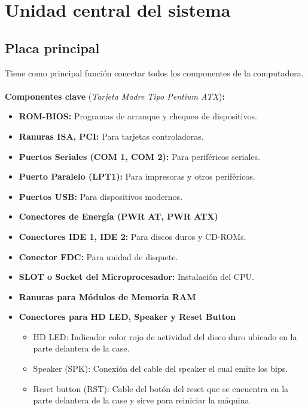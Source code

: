 \documentclass{templateNote}
\begin{document}
\section{Unidad central del sistema}

\subsection{Placa principal}
\noindent Tiene como principal función conectar todos los componentes de la computadora.\\\\
\textbf{Componentes clave} (\textit{Tarjeta Madre Tipo Pentium ATX})\textbf{:}
\begin{itemize}
    \item \textbf{ROM-BIOS:} Programas de arranque y chequeo de dispositivos.
    \item \textbf{Ranuras ISA, PCI:} Para tarjetas controladoras.
    \item \textbf{Puertos Seriales (COM 1, COM 2):} Para periféricos seriales.
    \item \textbf{Puerto Paralelo (LPT1):} Para impresoras y otros periféricos.
    \item \textbf{Puertos USB:} Para dispositivos modernos.
    \item \textbf{Conectores de Energía (PWR AT, PWR ATX)}
    \item \textbf{Conectores IDE 1, IDE 2:} Para discos duros y CD-ROMs.
    \item \textbf{Conector FDC:} Para unidad de disquete.
    \item \textbf{SLOT o Socket del Microprocesador:} Instalación del CPU.
    \item \textbf{Ranuras para Módulos de Memoria RAM}
    \item \textbf{Conectores para HD LED, Speaker y Reset Button}
    \begin{itemize}
        \item HD LED: Indicador color rojo de actividad del disco duro ubicado en 
        la parte delantera de la case.
        \item Speaker (SPK): Conexión del cable del speaker el cual emite los bips.
        \item Reset button (RST): Cable del botón del reset que se encuentra en la parte delantera de la case y sirve para reiniciar la máquina
    \end{itemize}
\end{itemize}
\end{document}
